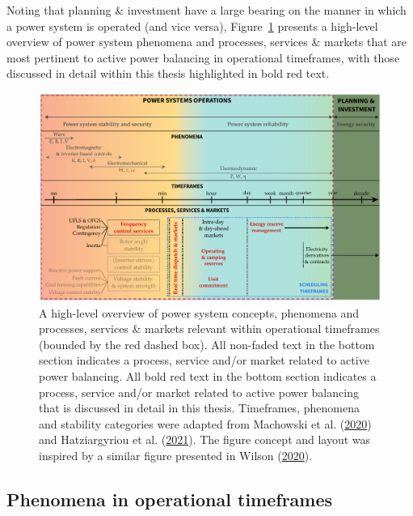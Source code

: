 \documentclass[12pt,a4paper,]{report}
\begin{document}
Noting that planning \& investment have a large bearing on the manner in
which a power system is operated (and vice versa),
Figure~\ref{fig:power_system_timeframes} presents a high-level overview
of power system phenomena and processes, services \& markets that are
most pertinent to active power balancing in operational timeframes, with
those discussed in detail within this thesis highlighted in bold red
text.

\begin{figure}
\hypertarget{fig:power_system_timeframes}{%
\centering
\includegraphics[width=1\textwidth,height=\textheight]{source/figures/power_system_timeframes.pdf}
\caption[High-level overview of power system concepts, phenomena and
processes, services \& markets relevant within operational timeframes]{A
high-level overview of power system concepts, phenomena and processes,
services \& markets relevant within operational timeframes (bounded by
the red dashed box). All non-faded text in the bottom section indicates
a process, service and/or market related to active power balancing. All
bold red text in the bottom section indicates a process, service and/or
market related to active power balancing that is discussed in detail in
this thesis. Timeframes, phenomena and stability categories were adapted
from Machowski et al.
(\protect\hyperlink{ref-machowskiPowerSystemDynamics2020}{2020}) and
Hatziargyriou et al.
(\protect\hyperlink{ref-hatziargyriouDefinitionClassificationPower2021}{2021}).
The figure concept and layout was inspired by a similar figure presented
in Wilson
(\protect\hyperlink{ref-wilsonIntroductoryPresentation20202020}{2020}).}\label{fig:power_system_timeframes}
}
\end{figure}

\hypertarget{phenomena-in-operational-timeframes}{%
\subsection{Phenomena in operational
timeframes}\label{phenomena-in-operational-timeframes}}
\end{document}
